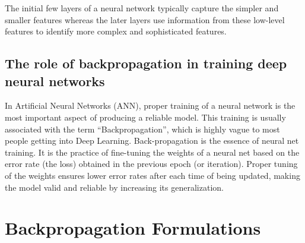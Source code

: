 \documentclass[14pt, a4paper]{article}
\numberwithin{equation}{section}
\numberwithin{algorithm}{section}
\numberwithin{figure}{section}
\begin{document}
The initial few layers of a neural network typically capture the simpler and smaller features whereas the later layers use information from these low-level features to identify more complex and sophisticated features.

\subsection{The role of backpropagation in training deep neural networks}

In Artificial Neural Networks (ANN), proper training of a neural network is the most important aspect of producing a reliable model. This training is usually associated with the term “Backpropagation”, which is highly vague to most people getting into Deep Learning. Back-propagation is the essence of neural net training. It is the practice of fine-tuning the weights of a neural net based on the error rate (the loss) obtained in the previous epoch (or iteration). Proper tuning of the weights ensures lower error rates after each time of being updated, making the model valid and reliable by increasing its generalization.

\section{Backpropagation Formulations}
\end{document}
